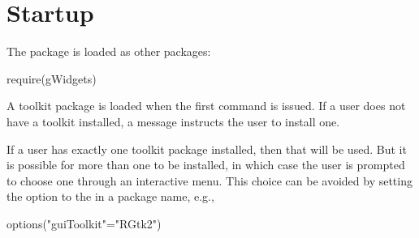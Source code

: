 



\section{Startup}
The  package is loaded as other \R\/ packages:
\begin{Schunk}
\begin{Sinput}
 require(gWidgets)
\end{Sinput}
\end{Schunk}

A toolkit package is loaded when the first command is issued. If a
user does not have a toolkit installed, a message instructs the user
to install one.

If a user has exactly one toolkit package installed, then that will be
used. But it is possible for more than one to be installed, in which
case the user is prompted to choose one through an interactive menu. This
choice can be avoided by setting the option  to the
 in a  package name, e.g.,
\begin{Schunk}
\begin{Sinput}
 options("guiToolkit"="RGtk2")
\end{Sinput}
\end{Schunk}

